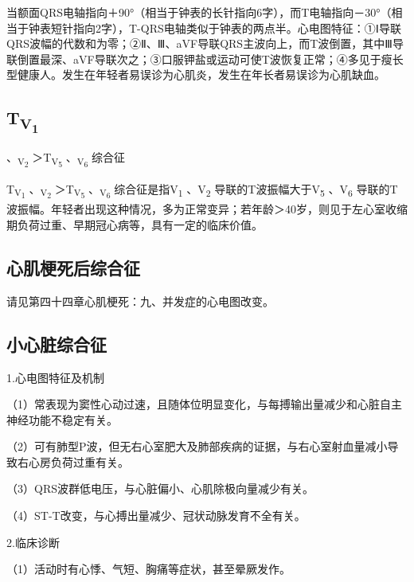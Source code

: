 当额面QRS电轴指向＋90°（相当于钟表的长针指向6字），而T电轴指向－30°（相当于钟表短针指向2字），T-QRS电轴类似于钟表的两点半。心电图特征：①Ⅰ导联QRS波幅的代数和为零；②Ⅱ、Ⅲ、aVF导联QRS主波向上，而T波倒置，其中Ⅲ导联倒置最深、aVF导联次之；③口服钾盐或运动可使T波恢复正常；④多见于瘦长型健康人。发生在年轻者易误诊为心肌炎，发生在年长者易误诊为心肌缺血。

\protect\hypertarget{text00047.htmlux5cux23subid563}{}{}

\subsection{T\textsubscript{V\textsubscript{1}}}
、\textsubscript{V\textsubscript{2}}
＞T\textsubscript{V\textsubscript{5}}
、\textsubscript{V\textsubscript{6}} 综合征

T\textsubscript{V\textsubscript{1}} 、\textsubscript{V\textsubscript{2}}
＞T\textsubscript{V\textsubscript{5}}
、\textsubscript{V\textsubscript{6}} 综合征是指V\textsubscript{1}
、V\textsubscript{2} 导联的T波振幅大于V\textsubscript{5}
、V\textsubscript{6}
导联的T波振幅。年轻者出现这种情况，多为正常变异；若年龄＞40岁，则见于左心室收缩期负荷过重、早期冠心病等，具有一定的临床价值。

\protect\hypertarget{text00047.htmlux5cux23subid564}{}{}

\subsection{心肌梗死后综合征}

请见第四十四章心肌梗死：九、并发症的心电图改变。

\protect\hypertarget{text00047.htmlux5cux23subid565}{}{}

\subsection{小心脏综合征}

1.心电图特征及机制

（1）常表现为窦性心动过速，且随体位明显变化，与每搏输出量减少和心脏自主神经功能不稳定有关。

（2）可有肺型P波，但无右心室肥大及肺部疾病的证据，与右心室射血量减小导致右心房负荷过重有关。

（3）QRS波群低电压，与心脏偏小、心肌除极向量减少有关。

（4）ST-T改变，与心搏出量减少、冠状动脉发育不全有关。

2.临床诊断

（1）活动时有心悸、气短、胸痛等症状，甚至晕厥发作。

